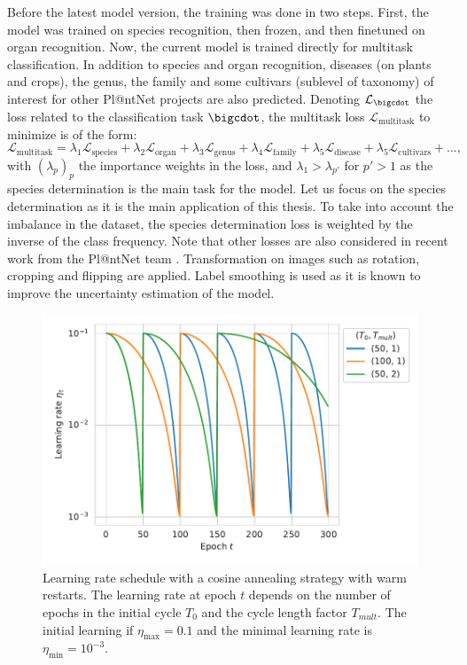 Before the latest model version, the training was done in two steps.
First, the model was trained on species recognition, then frozen, and then finetuned on organ recognition.
Now, the current model is trained directly for multitask classification.
In addition to species and organ recognition, diseases (on plants and crops), the genus, the family and some cultivars (sublevel of taxonomy) of interest for other Pl@ntNet projects are also predicted.
Denoting $\mathcal{L}_{\bigcdot}$ the loss related to the classification task $\bigcdot$, the multitask loss $\mathcal{L}_{\text{multitask}}$ to minimize is of the form:
\[
\mathcal{L}_{\text{multitask}} = \lambda_1 \mathcal{L}_\text{species} + \lambda_2\mathcal{L}_\text{organ} + \lambda_3 \mathcal{L}_\text{genus} + \lambda_4 \mathcal{L}_\text{family} + \lambda_5 \mathcal{L}_\text{disease} + \lambda_5 \mathcal{L}_\text{cultivars} + \dots,
\]
with $(\lambda_p)_p$ the importance weights in the loss, and $\lambda_1 > \lambda_{p'}$ for $p'>1$ as the species determination is the main task for the model.
Let us focus on the species determination as it is the main application of this thesis.
To take into account the imbalance in the dataset, the species determination loss is weighted by the inverse of the class frequency. Note that other losses are also considered in recent work from the Pl@ntNet team \citep{Garcin_Servajean_Joly_Salmon22}.
Transformation on images such as rotation, cropping and flipping are applied.
Label smoothing is used as it is known to improve the uncertainty estimation of the model.

\begin{figure}[htb]
    \centering
    \includegraphics[width=.65\textwidth]{./images_plantnet/cosine_annealing_restart.pdf}
    \caption{Learning rate schedule with a cosine annealing strategy with warm restarts. The learning rate at epoch $t$ depends on the number of epochs in the initial cycle $T_0$ and the cycle length factor $T_{mult}$. The initial learning if $\eta_{\max}=0.1$ and the minimal learning rate is $\eta_{\min}=10^{-3}$.}
    \label{fig:lrscheduler}
\end{figure}

